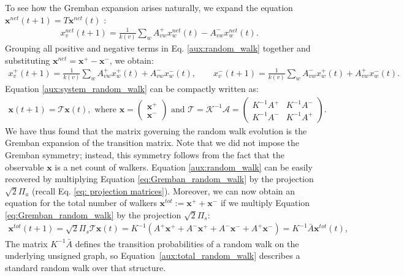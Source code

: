 \documentclass[reprint,onecolumn]{article}
\newcommand{\mc}[1]{\mathcal{#1}}
\newcommand{\1}{\mathbb{1}}
\newcommand{\x}{\mathbf{x}}
\newcommand{\0}{\mathbf{0}}
\begin{document}
To see how the Gremban expansion arises naturally, we expand the equation $\x^{net}(t+1)= T \x^{net}(t)$ \cite{tian2024spreading}:
\begin{align} \label{aux:random_walk}
    x_v^{net}(t+1)= \frac1{k(v)} \sum_w A^+_{vw} x_w^{net}(t) - A^-_{vw} x_w^{net}(t).
\end{align}
Grouping all positive and negative terms in Eq. \eqref{aux:random_walk} together
and substituting $\x^{net}=\x^+-\x^-$, we obtain:
\begin{align}  \label{aux:system_random_walk}
    x_v^+(t+1) = \frac1{k(v)} \sum_w A^+_{vw} x_w^+(t) + A^-_{vw} x_w^-(t), \qquad
    x_v^-(t+1) = \frac1{k(v)} \sum_w A^-_{vw} x_w^+(t) + A^+_{vw} x_w^-(t).
\end{align}
Equation \eqref{aux:system_random_walk} can be compactly written as:
\begin{align}  \label{eq:Gremban_random_walk}
    \x(t+1)=\mc T \x(t),  \textrm{  where  }
\x = \begin{pmatrix}
    \x^+ \\ \x^-
\end{pmatrix}  \textrm{  and  } \mc T = \mc K^{-1} \mc A = \begin{pmatrix}
K^{-1}A^+ & K^{-1}A^- \\
K^{-1}A^- & K^{-1}A^+
\end{pmatrix}.
\end{align}
We have thus found that the matrix governing the random walk evolution is the Gremban expansion of the transition matrix. Note that we did not impose the Gremban symmetry; instead, this symmetry follows from the fact that the observable $\x$ is a net count of walkers. Equation \eqref{aux:random_walk} can be easily recovered by multiplying Equation \eqref{eq:Gremban_random_walk} by the projection $\sqrt{2}\Pi_a$ (recall Eq. \eqref{eq: projection matrices}). Moreover, we can now obtain an equation for the total number of walkers $\x^{tot}:=\x^++\x^-$ if we multiply Equation \eqref{eq:Gremban_random_walk} by the projection $\sqrt{2}\Pi_s$:
\begin{align}  \label{aux:total_random_walk}
    \x^{tot}(t+1)= \sqrt{2} \Pi_s \mc T \x(t) = K^{-1} (A^+\x^++A^-\x^++A^-\x^-+A^+\x^-) = K^{-1}\bar A \x^{tot}(t),
\end{align}
The matrix \( K^{-1}\bar A \) defines the transition probabilities of a random walk on the underlying unsigned graph, so Equation~\eqref{aux:total_random_walk} describes a standard random walk over that structure.
\end{document}
